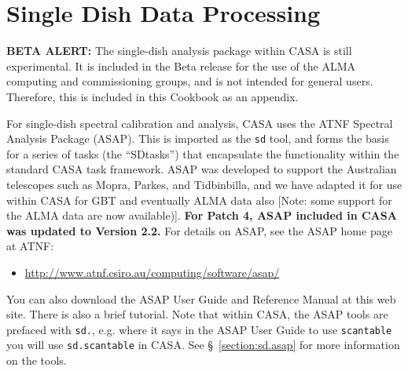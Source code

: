 

\chapter[Appendix: Single Dish Data Processing]{Single Dish Data Processing}
\label{chapter:sd}


{\bf BETA ALERT:} The single-dish analysis package within CASA
is still experimental.
It is included in the Beta release for the use
of the ALMA computing and commissioning groups, and is not intended
for general users.  Therefore, this is included in this Cookbook
as an appendix.  

For single-dish spectral calibration and analysis, 
CASA uses the ATNF Spectral Analysis Package (ASAP).
This is
imported as the {\tt sd} tool, and forms the basis for a series
of tasks (the ``SDtasks'') that encapsulate the functionality
within the standard CASA task framework.  ASAP was developed to
support the Australian telescopes such as Mopra, Parkes, and
Tidbinbilla, and we have adapted it for use within CASA for
GBT and eventually ALMA data also [Note: some support for the ALMA
data are now available)].  
{\bf For Patch 4, ASAP included in CASA was updated to Version 2.2.}
For details on ASAP, see
the ASAP home page at ATNF: 
\begin{itemize}
   \item \url{http://www.atnf.csiro.au/computing/software/asap/}
\end{itemize}
You can also download the ASAP User Guide and Reference Manual at this
web site.  There is also a brief tutorial.  Note that within CASA,
the ASAP tools are prefaced with {\tt sd.}, e.g. where it
says in the ASAP User Guide to use {\tt scantable} you will use
{\tt sd.scantable} in CASA.  See \S~\ref{section:sd.asap} for more
information on the tools.

